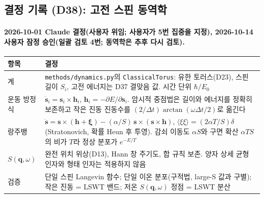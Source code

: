 \subsection{결정 기록 (D38): 고전 스핀 동역학}\label{decisions-d38-dynamics}
\begingroup%
  \framesubtitle{2026-10-01 Claude 결정(사용자 위임; 사용자가 5번 집중을 지정), 2026-10-14 사용자 잠정 승인(일괄 검토 4번; 동역학은 추후 다시 검토).}
  \small\renewcommand{\arraystretch}{1.12}
  \begin{tabularx}{\textwidth}{@{}P{3.0cm}Y@{}}
    \toprule
    항목 & 결정 \\
    \midrule
    계 & \texttt{methods/dynamics.py}의 \texttt{ClassicalTorus}: 유한 토러스(D23), 스핀 길이 $S_i$, 고전 에너지는 D37 결맞음 값. 시간 단위 $\hbar/E_0$ \\
    운동 방정식 & $\dot{\mathbf s}_i=\mathbf s_i\times\mathbf h_i$, $\mathbf h_i=-\partial E/\partial\mathbf s_i$. 암시적 중점법은 길이와 에너지를 정확히 보존하고 작은 진동 진동수를 $(2/\Delta t)\arctan(\omega\Delta t/2)$로 옮긴다 \\
    랑주뱅 & $\dot{\mathbf s}=\mathbf s\times(\mathbf h+\boldsymbol\xi)-(\alpha/S)\,\mathbf s\times(\mathbf s\times\mathbf h)$, $\langle\xi\xi\rangle=(2\alpha T/S)\delta$ (Stratonovich, 확률 Heun 후 투영). 감쇠 이동도 $\alpha S$와 구면 확산 $\alpha TS$의 비가 $T$라 정상 분포가 $e^{-E/T}$ \\
    $S(\mathbf q,\omega)$ & 완전 위치 위상(D13), Hann 창 주기도, 합 규칙 보존. 양자 상세 균형 인자와 형태 인자는 적용하지 않음 \\
    검증 & 단일 스핀 Langevin 함수; 단일 이온 분포(구적법, large-S 값과 구별); 작은 진동 = LSWT 밴드; 저온 $S(\mathbf q,\omega)$ 정점 = LSWT 분산 \\
    \bottomrule
  \end{tabularx}
\endgroup



